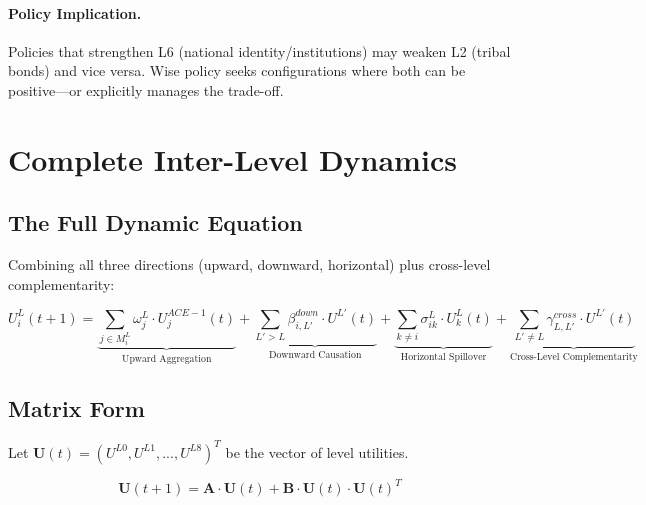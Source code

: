 \paragraph{Policy Implication.}
Policies that strengthen L6 (national identity/institutions) may weaken L2
(tribal bonds) and vice versa. Wise policy seeks configurations where both
can be positive---or explicitly manages the trade-off.

\section{Complete Inter-Level Dynamics}
\label{sec:aaa-complete-dynamics}

\subsection{The Full Dynamic Equation}

Combining all three directions (upward, downward, horizontal) plus cross-level
complementarity:

\begin{tcolorbox}[colback=green!5!white, colframe=green!50!black, title=Complete Inter-Level Utility Dynamics]
\begin{equation}
\boxed{
U^L_i(t+1) = \underbrace{\sum_{j \in M^L_i} \omega^L_j \cdot U^{ACE-1}_j(t)}_{\text{Upward Aggregation}}
+ \underbrace{\sum_{L' > L} \beta^{down}_{i,L'} \cdot U^{L'}(t)}_{\text{Downward Causation}}
+ \underbrace{\sum_{k \neq i} \sigma^L_{ik} \cdot U^L_k(t)}_{\text{Horizontal Spillover}}
+ \underbrace{\sum_{L' \neq L} \gamma^{cross}_{L,L'} \cdot U^{L'}(t)}_{\text{Cross-Level Complementarity}}
}
\label{eq:aaa-complete-dynamics}
\end{equation}
\end{tcolorbox}

\subsection{Matrix Form}

Let $\mathbf{U}(t) = (U^{L0}, U^{L1}, ..., U^{L8})^T$ be the vector of level utilities.

\begin{equation}
\mathbf{U}(t+1) = \mathbf{A} \cdot \mathbf{U}(t) + \mathbf{B} \cdot \mathbf{U}(t) \cdot \mathbf{U}(t)^T
\end{equation}

